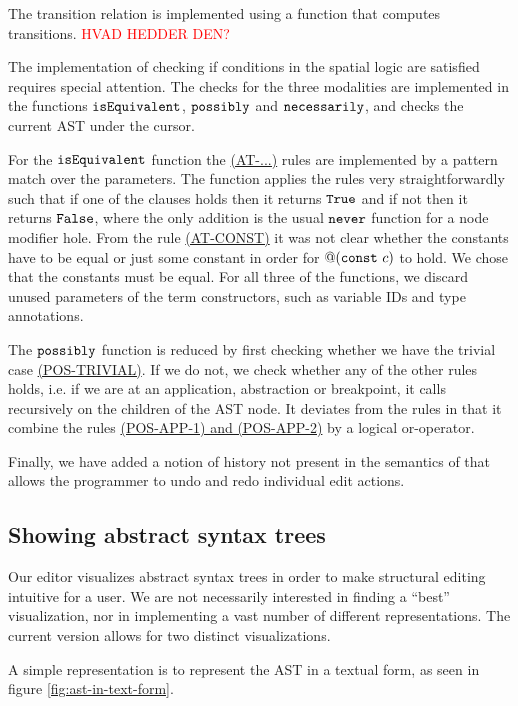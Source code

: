 The transition relation is implemented using a function that computes
transitions. \textcolor{red}{HVAD HEDDER DEN?}

The implementation of checking if conditions in the spatial logic are
satisfied requires special attention. The checks for the three
modalities are implemented in the functions $\texttt{isEquivalent}$,
$\texttt{possibly}$ and $\texttt{necessarily}$, and checks the current AST
under the cursor.

For the $\texttt{isEquivalent}$ function the
\hyperref[fig:conditionreductionrules]{(AT-...)} rules are implemented by a
pattern match over the parameters.
The function applies the rules very straightforwardly such that if one of the
clauses holds then it returns $\texttt{True}$ and if not then it returns
$\texttt{False}$, where the only addition is the usual $\texttt{never}$ function
for a node modifier hole. From the rule
\hyperref[fig:conditionreductionrules]{(AT-CONST)} it was not clear whether the
constants have to be equal or just some constant in order for $@(\texttt{const}~c)$ to
hold. We chose that the constants must be equal.
For all three of the functions, we discard unused parameters of the term
constructors, such as variable IDs and type annotations.

The $\texttt{possibly}$ function is reduced by first checking whether we have the
trivial case \hyperref[fig:conditionreductionrules]{(POS-TRIVIAL)}. If we do
not, we check whether any of the other rules holds, i.e. if we are at an
application, abstraction or breakpoint, it calls recursively on the children of
the AST node. It deviates from the rules in that it combine the rules
\hyperref[fig:conditionreductionrules]{(POS-APP-1) and (POS-APP-2)} by a logical
or-operator.

Finally, we have added a notion of history not present in the
semantics of \cite{10.1145/3441296.3441393} that allows the programmer
to undo and redo individual edit actions. 

\subsection{Showing abstract syntax trees}

Our editor visualizes abstract syntax trees in order to make
structural editing intuitive for a user.  We are not necessarily
interested in finding a ``best'' visualization, nor in implementing a
vast number of different representations. The current version allows
for two distinct visualizations.

A simple representation is to represent the AST in a textual form,
as seen in figure \ref{fig:ast-in-text-form}.

